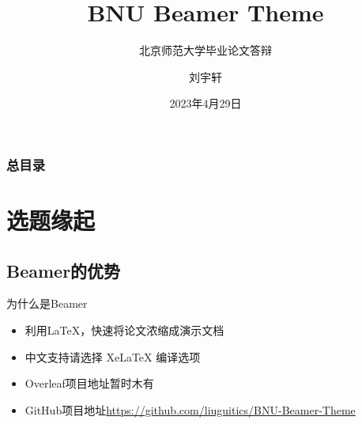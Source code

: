 \documentclass{beamer}
\author[Yuxuan Liu]{刘宇轩}
\title{BNU Beamer Theme}
\subtitle{北京师范大学毕业论文答辩}
\institute[北京师范大学 文学院]{文学院\\语言学及应用语言学研究所}
\date{2023年4月29日}
\begin{document}


\begin{frame}
    \titlepage
\end{frame}

\begin{frame}
    \frametitle{总目录}
    \begin{multicols}{2}
     \tableofcontents[hideallsubsections]
    \end{multicols}
\end{frame}

\section{选题缘起}
\subsection{Beamer的优势}
\begin{frame}{为什么是Beamer}
    \begin{itemize}[<+-| alert@+>] %
        \item 利用\LaTeX{}，快速将论文浓缩成演示文档
        \item 中文支持请选择 Xe\LaTeX{} 编译选项 
        \item Overleaf项目地址暂时木有
        \item GitHub项目地址\newline\url{https://github.com/liuguitics/BNU-Beamer-Theme}
    \end{itemize}
\end{frame}
\end{document}
